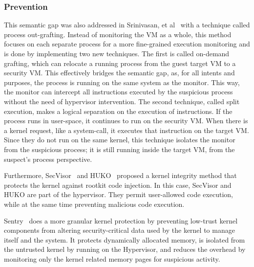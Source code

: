 \subsubsection{Prevention}

\par This semantic gap was also addressed in Srinivasan, et al~\cite{srinivasan2011process} with a technique called process out-grafting. Instead of monitoring the \ac{VM} as a whole, this method focuses on each separate process for a more fine-grained execution monitoring and is done by implementing two new techniques. The first is called on-demand grafting, which can relocate a running process from the guest target \ac{VM} to a security \ac{VM}. This effectively bridges the semantic gap, as, for all intents and purposes, the process is running on the same system as the monitor. This way, the monitor can intercept all instructions executed by the suspicious process without the need of hypervisor intervention. The second technique, called split execution, makes a logical separation on the execution of instructions. If the process runs in user-space, it continues to run on the security \ac{VM}. When there is a kernel request, like a system-call, it executes that instruction on the target \ac{VM}. Since they do not run on the same kernel, this technique isolates the monitor from the suspicious process; it is still running inside the target \ac{VM}, from the suspect’s process perspective. 

\par Furthermore, SecVisor~\cite{seshadri2007secvisor} and HUKO~\cite{xiong2011practical} proposed a kernel integrity method that protects the kernel against rootkit code injection. In this case, SecVisor and HUKO are part of the hypervisor. They permit user-allowed code execution, while at the same time preventing malicious code execution.


\par Sentry~\cite{srivastava2012efficient} does a more granular kernel protection by preventing low-trust kernel components from altering security-critical data used by the kernel to manage itself and the system. It protects dynamically allocated memory, is isolated from the untrusted kernel by running on the Hypervisor, and reduces the overhead by monitoring only the kernel related memory pages for suspicious activity.


